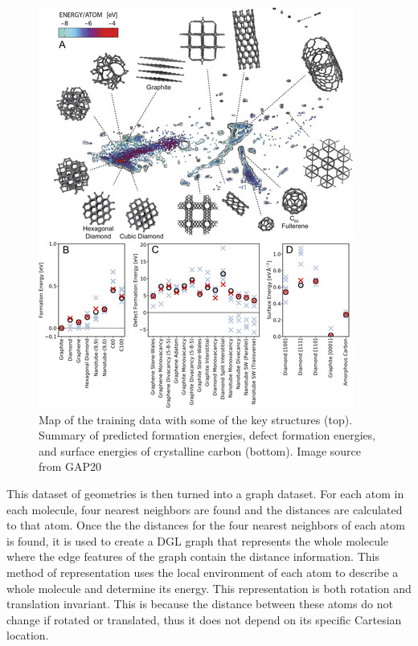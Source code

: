 \documentclass[12pt, abstract = true]{scrartcl}
\begin{document}
\begin{figure}
  \centering
  \includegraphics[scale=2]{carbon}
  
  \caption{Map of the training data with some of the key structures (top). Summary of predicted formation energies, defect formation energies, and surface energies of crystalline carbon (bottom). Image source from GAP20\cite{gap20}}\label{fig:train}
\end{figure}


This dataset of geometries is then turned into a graph dataset. For each atom in each molecule, four nearest neighbors are found and the distances are calculated to that atom. Once the the distances for the four nearest neighbors of each atom is found, it is used to create a DGL\cite{dgl} graph that represents the whole molecule where the edge features of the graph contain the distance information. This method of representation uses the local environment of each atom to describe a whole molecule and determine its energy. This representation is both rotation and translation invariant. This is because the distance between these atoms do not change if rotated or translated, thus it does not depend on its specific Cartesian location.
\end{document}
